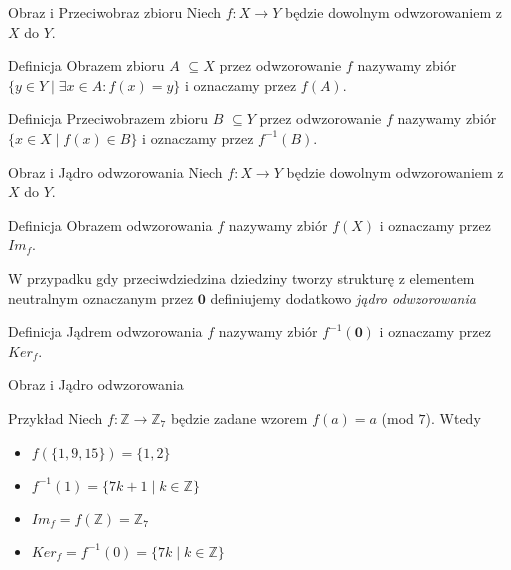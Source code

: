\documentclass{beamer}
\newcommand{\zero}{\mathbf{0}}
\begin{document}
\begin{frame}{Obraz i Przeciwobraz zbioru}
    Niech $f : X \rightarrow Y$ będzie dowolnym odwzorowaniem z $X$ do $Y$. 
    \begin{block}{Definicja}
        \alert{Obrazem zbioru $A$} $ \subseteq X$ przez odwzorowanie $f$ nazywamy zbiór 
        $\{y \in Y \mid \exists x \in A : f(x) = y\}$ i oznaczamy przez $f(A)$.
    \end{block}
    \begin{block}{Definicja}
        \alert{Przeciwobrazem zbioru $B$ } $ \subseteq Y$ przez odwzorowanie $f$ nazywamy zbiór 
        $\{ x \in X  \mid  f(x) \in B \}$ i oznaczamy przez $f^{-1}(B)$.
    \end{block}
\end{frame}

\begin{frame}{Obraz i Jądro odwzorowania }
    Niech $f : X \rightarrow Y$ będzie dowolnym odwzorowaniem z $X$ do $Y$. 
    \begin{block}{Definicja}
        \alert{Obrazem odwzorowania $f$} nazywamy zbiór $f(X)$ i oznaczamy przez $Im_f$.
    \end{block}
    W przypadku gdy przeciwdziedzina dziedziny tworzy strukturę z elementem neutralnym oznaczanym przez $\zero$
    definiujemy dodatkowo \textit{jądro odwzorowania}
    \begin{block}{Definicja}
        \alert{Jądrem odwzorowania $f$} nazywamy zbiór $f^{-1}(\zero)$ i oznaczamy przez $Ker_f$.
    \end{block}
\end{frame}

\begin{frame}{Obraz i Jądro odwzorowania}
    \begin{exampleblock}{Przykład}
        Niech $f : \mathbb{Z} \rightarrow \mathbb{Z}_7$ będzie zadane wzorem $f(a) = a $ (mod $7$).
        Wtedy
        \begin{itemize}
            \item $f(\{1,9,15\}) = \{1,2\}$
            \item $f^{-1}(1) = \{ 7k + 1 \mid k \in \mathbb{Z}\}$
            \item $Im_f = f(\mathbb{Z}) = \mathbb{Z}_7$
            \item $Ker_f =f^{-1}(0) = \{ 7k \mid k \in \mathbb{Z} \}$ 
        \end{itemize}
    \end{exampleblock}
\end{frame}
\end{document}
